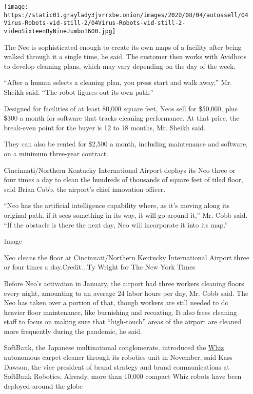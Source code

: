 \texttt{[image: https://static01.graylady3jvrrxbe.onion/images/2020/08/04/autossell/04Virus-Robots-vid-still-2/04Virus-Robots-vid-still-2-videoSixteenByNineJumbo1600.jpg]}

The Neo is sophisticated enough to create its own maps of a facility
after being walked through it a single time, he said. The customer then
works with Avidbots to develop cleaning plans, which may vary depending
on the day of the week.

``After a human selects a cleaning plan, you press start and walk
away,'' Mr. Sheikh said. ``The robot figures out its own path.''

Designed for facilities of at least 80,000 square feet, Neos sell for
\$50,000, plus \$300 a month for software that tracks cleaning
performance. At that price, the break-even point for the buyer is 12 to
18 months, Mr. Sheikh said.

They can also be rented for \$2,500 a month, including maintenance and
software, on a minimum three-year contract.

Cincinnati/Northern Kentucky International Airport deploys its Neo three
or four times a day to clean the hundreds of thousands of square feet of
tiled floor, said Brian Cobb, the airport's chief innovation officer.

``Neo has the artificial intelligence capability where, as it's moving
along its original path, if it sees something in its way, it will go
around it,'' Mr. Cobb said. ``If the obstacle is there the next day, Neo
will incorporate it into its map.''

Image

Neo cleans the floor at Cincinnati/Northern Kentucky International
Airport three or four times a day.Credit...Ty Wright for The New York
Times

Before Neo's activation in January, the airport had three workers
cleaning floors every night, amounting to an average 24 labor hours per
day, Mr. Cobb said. The Neo has taken over a portion of that, though
workers are still needed to do heavier floor maintenance, like
burnishing and recoating. It also frees cleaning staff to focus on
making sure that ``high-touch'' areas of the airport are cleaned more
frequently during the pandemic, he said.

SoftBank, the Japanese multinational conglomerate, introduced the
\href{https://13779usreg20181102.com/us/whiz}{Whiz} autonomous carpet
cleaner through its robotics unit in November, said Kass Dawson, the
vice president of brand strategy and brand communications at SoftBank
Robotics. Already, more than 10,000 compact Whiz robots have been
deployed around the globe

